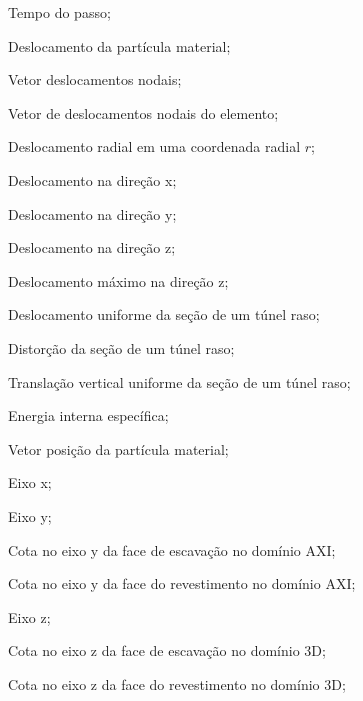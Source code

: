 \item[$ t_p $] 			Tempo do passo;
\item[$ \ul $] 		    Deslocamento da partícula material;
\item[$ \ul $] 		    Vetor deslocamentos nodais;
\item[$ \ul_e $] 		    Vetor de deslocamentos nodais do elemento;
\item[$ u(r) $] 		Deslocamento radial em uma coordenada radial $r$;
\item[$ u_x $] 			Deslocamento na direção x;
\item[$ u_y $] 			Deslocamento na direção y;
\item[$ u_z $] 			Deslocamento na direção z;
\item[$ u_{z_{max}} $] 	Deslocamento máximo na direção z;
\item[$ u_\varepsilon $] Deslocamento uniforme da seção de um túnel raso;
\item[$ u_\delta $] 	 Distorção da seção de um túnel raso;
\item[$ \Delta u_y $] 	 Translação vertical uniforme da seção de um túnel raso;
\item[$ w $] 	 		Energia interna específica;
\item[$\xl$]			Vetor posição da partícula material;
\item[$x$]				Eixo x;
\item[$y$]				Eixo y;
\item[$y_f$]			Cota no eixo y da face de escavação no domínio AXI;
\item[$y_r$]			Cota no eixo y da face do revestimento no domínio AXI;
\item[$z$]				Eixo z;
\item[$z_f$]			Cota no eixo z da face de escavação no domínio 3D;
\item[$z_r$]			Cota no eixo z da face do revestimento no domínio 3D;

